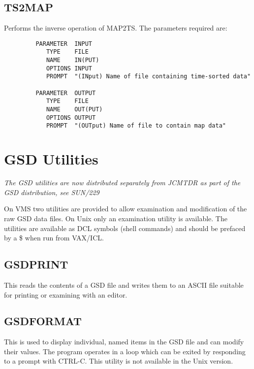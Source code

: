 \documentclass[twoside,11pt]{article}
\newcommand{\xlabel}[1]{}
\renewcommand{\_}{\texttt{\symbol{95}}}
\begin{document}
\goodbreak

\subsection{\xlabel{TS2MAP}TS2MAP}

Performs the inverse operation of MAP2TS. The parameters required are:

\begin{small}
\begin{verbatim}
         PARAMETER  INPUT
            TYPE    FILE
            NAME    IN(PUT)
            OPTIONS INPUT
            PROMPT  "(INput) Name of file containing time-sorted data"

         PARAMETER  OUTPUT
            TYPE    FILE
            NAME    OUT(PUT)
            OPTIONS OUTPUT
            PROMPT  "(OUTput) Name of file to contain map data"
\end{verbatim}
\end{small}


\goodbreak

\section{GSD Utilities\xlabel{gsd_utilities}}

\textit{The GSD utilities are now distributed separately from JCMTDR
as part of the GSD distribution, see SUN/229}

On VMS two utilities are provided to allow examination and  modification of
the raw GSD data files. On Unix only an examination utility is
available.
The utilities are available as DCL symbols (shell commands) and should
be prefaced by a \$ when run from VAX/ICL.

\subsection{\xlabel{GSD_PRINT}GSD\_PRINT}

This reads the contents of a GSD file and writes them to an ASCII file
suitable for printing or examining with an editor.

\subsection{\xlabel{GSD_FORMAT}GSD\_FORMAT}

This is used to display individual, named items in the GSD file and
can modify their values. The program operates in a loop which can be
exited by responding to a prompt with CTRL-C. This utility is not
available in the Unix version.
\end{document}
